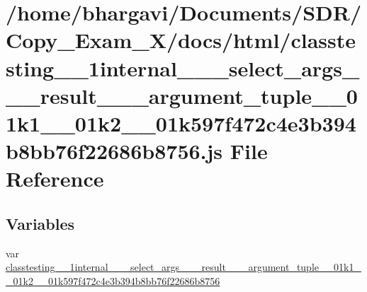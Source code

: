 \hypertarget{classtesting__1__1internal__1__1__select__args__3__01__result__00__01__argument__tuple__00__01k12c42ad329604852c73997a209def0f82}{}\section{/home/bhargavi/\+Documents/\+S\+D\+R/\+Copy\+\_\+\+Exam\+\_\+X/docs/html/classtesting\+\_\+\_\+1internal\+\_\+\_\+\_\+select\+\_\+args\+\_\+\_\+\_\+result\+\_\+\_\+\_\+argument\+\_\+tuple\+\_\+\_\+01k1\+\_\+\_\+01k2\+\_\+\_\+01k597f472c4e3b394b8bb76f22686b8756.js File Reference}
\label{classtesting__1__1internal__1__1__select__args__3__01__result__00__01__argument__tuple__00__01k12c42ad329604852c73997a209def0f82}
\subsection*{Variables}
\begin{DoxyCompactItemize}
\item 
var \hyperlink{classtesting__1__1internal__1__1__select__args__3__01__result__00__01__argument__tuple__00__01k12c42ad329604852c73997a209def0f82_a8de91c82ba06d5851459ca052b8afb3f}{classtesting\+\_\+\_\+1internal\+\_\+\_\+\_\+select\+\_\+args\+\_\+\_\+\_\+result\+\_\+\_\+\_\+argument\+\_\+tuple\+\_\+\_\+01k1\+\_\+\_\+01k2\+\_\+\_\+01k597f472c4e3b394b8bb76f22686b8756}
\end{DoxyCompactItemize}


